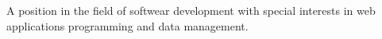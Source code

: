 \documentclass[9pt]{developercv} %
\begin{document}
\vspace{0.5cm}



\begin{minipage}[t]{0.4\textwidth} %
 A position in the field of softwear development with special interests in web applications programming and data management.
\end{minipage}
\hfill %
\begin{minipage}[t]{0.5\textwidth} %
	\vspace{-\baselineskip} %
	\begin{barchart}{5.5}
	\end{barchart}
\end{minipage}

\begin{center}
\end{center}


\end{document}
